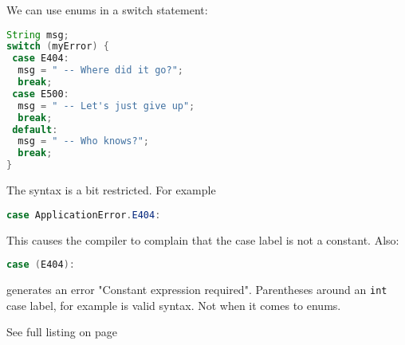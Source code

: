 We can use enums in a switch statement:
\begin{lstlisting}[language=Java]
String msg;
switch (myError) {
 case E404:
  msg = " -- Where did it go?";
  break;
 case E500:
  msg = " -- Let's just give up";
  break;
 default:
  msg = " -- Who knows?";
  break;
}
\end{lstlisting}
The syntax is a bit restricted. For example
\begin{lstlisting}[language=Java]
case ApplicationError.E404:
\end{lstlisting}
This causes the compiler to complain that the case label is not a constant. Also:
\begin{lstlisting}[language=Java]
case (E404):
\end{lstlisting}
generates an error "Constant expression required". Parentheses around an \lstinline[columns=fixed]{int} case label, for example is valid syntax. Not when it comes to enums.

See full listing on page \pageref{App:AppendixI}